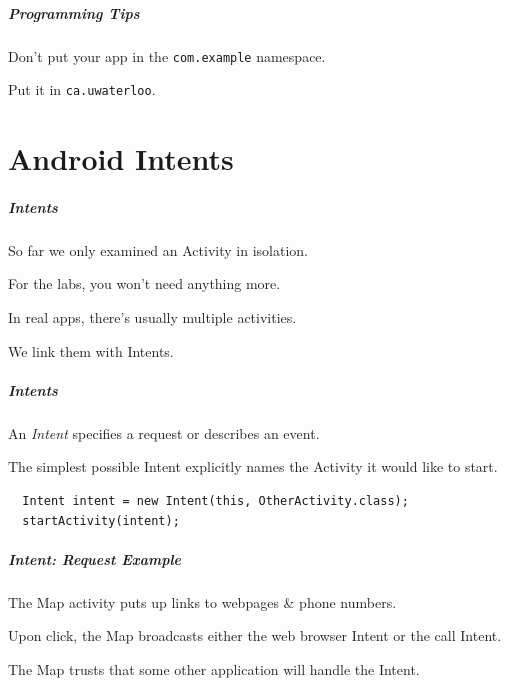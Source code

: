 \begin{frame}
\frametitle{Programming Tips}
\begin{changemargin}{1cm}

Don't put your app in the {\tt com.example} namespace. 

Put it in {\tt ca.uwaterloo}.
\end{changemargin}
\end{frame}

\part{Android Intents}
\frame{\partpage}

\begin{frame}
\frametitle{Intents}
\begin{changemargin}{1cm}

So far we only examined an Activity in isolation.

For the labs, you won't need anything more.

In real apps, there's usually multiple activities.

We link them with Intents.

\end{changemargin}
\end{frame}

\begin{frame}[fragile]
\frametitle{Intents}
\begin{changemargin}{1cm}

An \emph{Intent} specifies a request or describes an event.

The simplest possible Intent
explicitly names the Activity it would like to start.

{\small 
\begin{verbatim}
  Intent intent = new Intent(this, OtherActivity.class);
  startActivity(intent);
\end{verbatim}
}


\end{changemargin}
\end{frame}


\begin{frame}
\frametitle{Intent: Request Example}
\begin{changemargin}{1cm}


The Map activity puts up links to webpages 
\& phone numbers. 

Upon click, the Map broadcasts either the web browser
Intent or the call Intent.

The Map trusts that some other application will handle the Intent.
\end{changemargin}
\end{frame}



